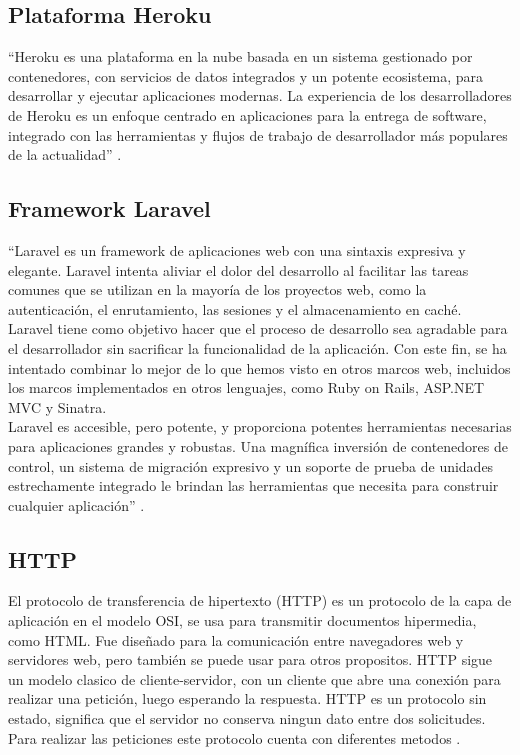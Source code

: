 \subsection{Plataforma Heroku}

``Heroku es una plataforma en la nube basada en un sistema gestionado por contenedores, con servicios de datos integrados y un potente ecosistema, para desarrollar y ejecutar aplicaciones modernas. La experiencia de los desarrolladores de Heroku es un enfoque centrado en aplicaciones para la entrega de software, integrado con las herramientas y flujos de trabajo de desarrollador más populares de la actualidad'' \cite{Hero}.\\


\subsection{Framework Laravel}

``Laravel es un framework de aplicaciones web con una sintaxis expresiva y elegante. Laravel intenta aliviar el dolor del desarrollo al facilitar las tareas comunes que se utilizan en la mayoría de los proyectos web, como la autenticación, el enrutamiento, las sesiones y el almacenamiento en caché.\\

Laravel tiene como objetivo hacer que el proceso de desarrollo sea agradable para el desarrollador sin sacrificar la funcionalidad de la aplicación. Con este fin, se ha intentado combinar lo mejor de lo que hemos visto en otros marcos web, incluidos los marcos implementados en otros lenguajes, como Ruby on Rails, ASP.NET MVC y Sinatra.\\

Laravel es accesible, pero potente, y proporciona potentes herramientas necesarias para aplicaciones grandes y robustas. Una magnífica inversión de contenedores de control, un sistema de migración expresivo y un soporte de prueba de unidades estrechamente integrado le brindan las herramientas que necesita para construir cualquier aplicación'' \cite{Lara}.\\

\subsection{HTTP}

El protocolo de transferencia de hipertexto (HTTP) es un protocolo de la capa de aplicación en el modelo OSI, se usa para transmitir documentos hipermedia, como HTML. Fue diseñado para la comunicación entre navegadores web y servidores web, pero también se puede usar para otros propositos. HTTP sigue un modelo clasico de cliente-servidor, con un cliente que abre una conexión para realizar una petición, luego esperando la respuesta. HTTP es un protocolo sin estado, significa que el servidor no conserva ningun dato entre dos solicitudes. Para realizar las peticiones este protocolo cuenta con diferentes metodos \cite{HTTP}.

